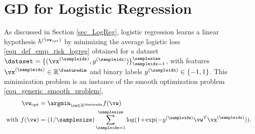 \documentclass[12pt]{report}
\begin{document}
\section{GD for Logistic Regression}
\label{sec_GD_logistic_regression}

As discussed in Section \ref{sec_LogReg}, logistic regression learns 
a linear hypothesis $h^{(\vw_{\rm opt})}$ by minimizing the average 
logistic loss \eqref{equ_def_emp_risk_logreg} obtained for a dataset $\dataset= \{ (\vx^{(\sampleidx)}, y^{(\sampleidx)}) \}_{\sampleidx=1}^{\samplesize}$, with features $\vx^{(\sampleidx)} \in \mathbb{R}^{\featuredim}$ and binary labels 
$y^{(\sampleidx)} \in \{-1,1\}$. This minimization problem is an instance 
of the smooth optimization problem \eqref{equ_generic_smooth_problem},
\begin{align} 
\label{equ_smooth_problem_logeg}
\vw_{\rm opt} & = \argmin_{\vw \in \mathbb{R}^{\featuredim}} f(\vw) \nonumber \\ 
 \mbox{ with } f(\vw) & = (1/\samplesize) \sum_{\sampleidx=1}^{\samplesize} \log( 1\!+\!\exp ( - y^{(\sampleidx)} \vw^{T} \vx^{(\sampleidx)})). 
\end{align} 
\end{document}
